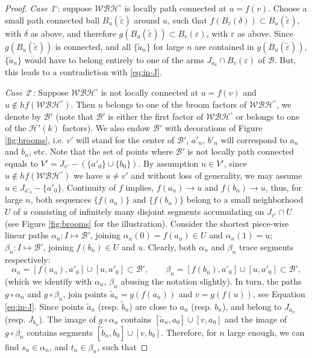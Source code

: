 \documentclass[reqno,12pt]{amsart}
\theoremstyle{ourremark}
\numberwithin{equation}{section}
\numberwithin{theorem}{section}
\begin{document}
\begin{proof}
{\em Case 1$^\circ$}: suppose $\mathcal{WBH}^\circ$ is locally path connected at $u=f(v)$. Choose a small path connected ball $B_u(\tilde{\varepsilon})$ around $u$, such that $f(B_v(\delta))\subset B_u(\tilde{\varepsilon})$, with $\delta$ as above, and therefore $g(B_u(\tilde{\varepsilon}))\subset B_v(\varepsilon)$, with $\varepsilon$ as above. Since $g(B_u(\tilde{\varepsilon}))$ is connected, and all $\{\tilde{a}_n\}$ for large $n$ are contained in  $g(B_u(\tilde{\varepsilon}))$, $\{\tilde{a}_n\}$ would have to belong entirely to one of the arms $J_{a_k}\cap B_v(\varepsilon)$ of $\mathcal{B}$. But, this leads to a contradiction with \eqref{eq:in-J}.

{\em Case 2$^\circ$:} Suppose $\mathcal{WBH}^\circ$ is not locally connected at $u=f(v)$ and $u\not\in hf(\mathcal{WBH}^\circ)$. 
Then $u$ belongs to one of the broom factors of $\mathcal{WBH}^\circ$, we denote by $\mathcal{B}'$ (note that $\mathcal{B}'$ is either the first factor of $\mathcal{WBH}^\circ$ or belongs to one of the $\mathcal{H}'(k)$ factors). 
We also endow $\mathcal{B}'$ with decorations of Figure \ref{fig:brooms}, i.e. $v'$ will stand for the center of $\mathcal{B}'$, $a'_n$, $b'_n$ will correspond to $a_n$ and $b_n$, etc. 
Note that the set of points where $\mathcal{B}'$ is not locally path connected equals to $V'=J_{v'}-(\{a'_0\}\cup \{b_0\})$. 
By assumption $u\in V'$, since $u\not\in hf(\mathcal{WBH}^\circ)$ we have $u\neq v'$ and without loss of generality, we may assume $u\in J_{a'_0}-\{a'_0\}$. 
Continuity of $f$ implies, $f(a_n)\to u$ and $f(b_n)\to u$, thus, for large $n$, both sequences $\{f(a_n)\}$ and $\{f(b_n)\}$ belong to a small neighborhood $U$ of $u$ consisting of infinitely many disjoint segments accumulating on  $J_{v'}\cap U$ (see Figure \ref{fig:brooms} for the illustration). 
Consider the shortest piece-wise linear paths $\alpha_n:I\longmapsto \mathcal{B}'$, joining $\alpha_n(0)=f(a_n)\in U$ and $\alpha_n(1)=u$; $\beta_n:I\longmapsto \mathcal{B}'$, joining $f(b_n)\in U$ and $u$. 
Clearly, both $\alpha_n$ and $\beta_n$ trace segments respectively:
\[
\alpha_n=[f(a_n),a'_0]\cup [u, a'_0]\subset \mathcal{B}',\qquad \beta_n=[f(b_n),a'_0]\cup [u, a'_0]\subset \mathcal{B}',
\] 
(which we identify with $\alpha_n$, $\beta_n$ abusing the notation slightly). 
In turn, the paths $g\circ \alpha_n$ and $g\circ \beta_n$, join points $\tilde{a}_n=g(f(a_n))$ and $v=g(f(u))$, see Equation \eqref{eq:in-J}. 
Since points $\tilde{a}_n$ (resp. $\tilde{b}_n$) are close to $a_n$ (resp. $b_n$), and belong to $J_{a_n}$ (resp. $J_{b_n}$).
The image of $g\circ \alpha_n$ contains $[\tilde{a}_n,a_0]\cup [v,a_0]$ and the image of  $g\circ \beta_n$ contains segments $[\tilde{b}_n,b_0]\cup [v,b_0]$. Therefore, for  $n$ large enough, we can find $s_n\in \alpha_n$, and $t_n\in \beta_n$, such that 

\end{proof}
\end{document}
